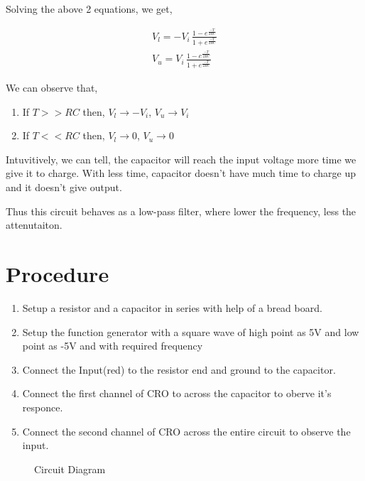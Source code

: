 \documentclass[journal]{IEEEtran}
\begin{document}
Solving the above 2 equations, we get,

\begin{align}
    V_l = -V_i\,\frac{1-e^{\frac{-T}{2RC}}}{1+e^{\frac{-T}{2RC}}}\\
    V_u = V_i\,\frac{1-e^{\frac{-T}{2RC}}}{1+e^{\frac{-T}{2RC}}}
\end{align}

We can observe that,

\begin{enumerate}
    \item If $T>>RC$ then, $V_l\to-V_i$, $V_u\to V_i$
    \item If $T<<RC$ then, $V_l\to 0$, $V_u\to0$
\end{enumerate}

Intuvitively, we can tell, the capacitor will reach the input voltage more time we give it to charge. With less time, capacitor doesn't have much time to charge up and it doesn't give output.

Thus this circuit behaves as a low-pass filter, where lower the frequency, less the attenutaiton.


\section{Procedure}

\begin{enumerate}
    \item Setup a resistor and a capacitor in series with help of a bread board.
    \item Setup the function generator with a square wave of high point as 5V and low point as -5V and with required frequency
    \item Connect the Input(red) to the resistor end and ground to the capacitor.
    \item Connect the first channel of CRO to across the capacitor to oberve it's responce.
    \item Connect the second channel of CRO across the entire circuit to observe the input.
\end{enumerate}

\begin{figure}[!ht]
    \centering
    \caption{Circuit Diagram}
\end{figure}
\end{document}
